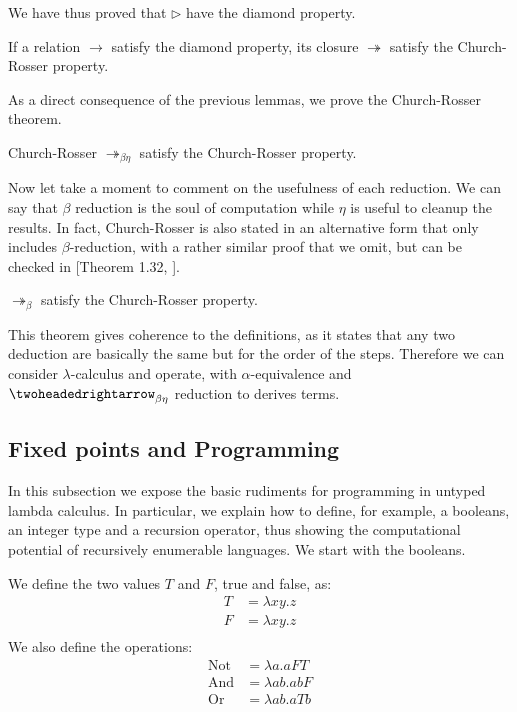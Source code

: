 \begin{remark}
  We have thus proved that $\triangleright$ have the diamond property.
\end{remark}

\begin{remark}
  If a relation $\to$ satisfy the diamond property, its closure $\twoheadrightarrow$ satisfy the Church-Rosser property.
\end{remark}


As a direct consequence of the previous lemmas, we prove the Church-Rosser theorem.
\begin{theorem}{Church-Rosser}
  $\twoheadrightarrow_{\beta\eta}$ satisfy the Church-Rosser property.
\end{theorem}

Now let take a moment to comment on the usefulness of each reduction. We can say that $\beta$ reduction is the soul of computation  while $\eta$ is useful to cleanup the results. In fact, Church-Rosser is also stated in an alternative form that only includes $\beta$-reduction, with a rather similar proof that we omit, but can be checked in [Theorem 1.32, \cite{hindley2008lambda}].

\begin{theorem}
  $\twoheadrightarrow_{\beta}$ satisfy the Church-Rosser property.
\end{theorem}

This theorem gives coherence to the definitions, as it states that any two deduction are basically the same but for the order of the steps. Therefore we can consider $\lambda$-calculus and operate, with $\alpha$-equivalence and $\twoheadedrightarrow_{\beta\eta}$ reduction to derives terms.\\





\subsection{Fixed points and Programming}
In this subsection we expose the basic rudiments for programming in untyped lambda calculus. In particular, we explain how to define, for example, a booleans, an integer type and a recursion operator, thus showing the computational potential of recursively enumerable languages. We start with the booleans.

\begin{definition} \label{def:untyped-natural} 
  We define the two values $T$ and $F$, true and false, as:
  \begin{align*}
    T &= \lambda xy.z\\
    F &= \lambda xy.z\\
  \end{align*}
  We also define the operations:
  \begin{align*}
    \operatorname{Not} &= \lambda a.aFT\\
    \operatorname{And} &= \lambda ab.abF\\
    \operatorname{Or} &= \lambda ab.aTb\\
  \end{align*}
\end{definition}

